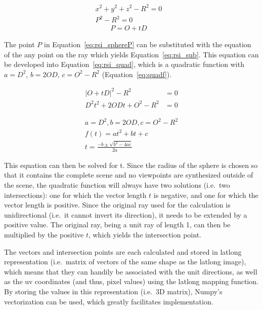 \begin{align}
  x^2 + y^2 + z^2 - R^2 = 0&\label{eq:rsi_spherefull}\\ 
  P^2 - R^2 = 0&\label{eq:rsi_sphereP}
\end{align} 
\begin{align}
  P = O + tD& \label{eq:rsi_point}
\end{align} 

The point $P$ in Equation~\ref{eq:rsi_sphereP} can be substituted with the equation of the any point on the ray which yields Equation~\ref{eq:rsi_sub}. This equation can be developed into Equation~\ref{eq:rsi_quad}, which is a quadratic function with $a = D^2$, $b = 2OD$, $c = O^2-R^2$ (Equation~\ref{eq:quadf}).

\begin{align}
  |O + tD|^2 - R^2 &= 0  \label{eq:rsi_sub}\\
  D^2 t^2 + 2ODt + O^2 - R^2 &= 0 \label{eq:rsi_quad}
\end{align}

\begin{align}
  a = D^2, b = 2OD, c = O^2-R^2 \nonumber \\
  f(t) = at^2 + bt + c \label{eq:quadf}\\
  t = \frac{-b \pm \sqrt{b^2 - 4ac}}{2a} \label{eq:solvequadf}
\end{align}

This equation can then be solved for t. Since the radius of the sphere is chosen so that it contains the complete scene and no viewpoints are synthesized outside of the scene, the quadratic function will always have two solutions (i.e.\ two intersections): one for which the vector length $t$ is negative, and one for which the vector length is positive. Since the original ray used for the calculation is unidirectional (i.e.\ it cannot invert its direction), it needs to be extended by a positive value. The original ray, being a unit ray of length 1, can then be multiplied by the positive $t$, which yields the intersection point. 

The vectors and intersection points are each calculated and stored in latlong representation (i.e.\ matrix of vectors of the same shape as the latlong image), which means that they can handily be associated with the unit directions, as well as the uv coordinates (and thus, pixel values) using the latlong mapping function. By storing the values in this representation (i.e.\ 3D matrix), Numpy's vectorization can be used, which greatly facilitates implementation.

